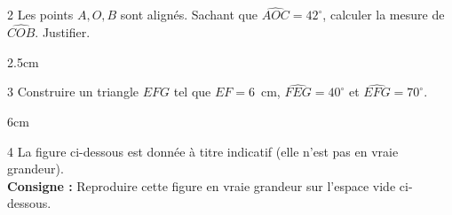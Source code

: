 \documentclass[a4paper]{book}
\begin{document}
{    
    \begin{exerciceNote}{2}
        Les points $A, O, B$ sont alignés. Sachant que $\widehat{AOC} = 42^{\circ}$, calculer la mesure de $\widehat{COB}$. Justifier.

        \begin{center}
        \end{center}
        
        \begin{ZoneReponse}{2.5cm}
        \end{ZoneReponse}
    \end{exerciceNote}

    
    \begin{exerciceNote}{3}
        Construire un triangle $EFG$ tel que $EF = 6$~cm, $\widehat{FEG} = 40^{\circ}$ et $\widehat{EFG} = 70^{\circ}$.
        
        \begin{ZoneReponse}{6cm}
        \end{ZoneReponse}
    \end{exerciceNote}


\newpage


    \begin{exerciceNote}{4}
        La figure ci-dessous est donnée à titre indicatif (elle n'est pas en vraie grandeur).
        \\ \textbf{Consigne :} Reproduire cette figure en vraie grandeur sur l'espace vide ci-dessous.
        
        \begin{center}
\end{center}
\end{exerciceNote}}
\end{document}
